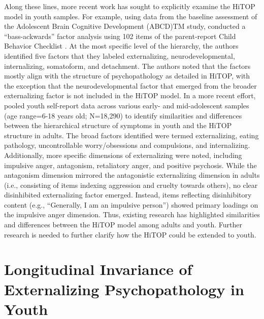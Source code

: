 \documentclass[
  20pt,
  number,
  preprint,
  3p,
  twocolumn]{elsarticle}
\begin{document}
Along these lines, more recent work has sought to explicitly examine the
HiTOP model in youth samples. For example, using data from the baseline
assessment of the Adolescent Brain Cognitive Development (ABCD)TM study,
\citep{michelini2019} conducted a ``bass-ackwards'' factor analysis
\citep{goldberg2006} using 102 items of the parent-report Child Behavior
Checklist \citep{achenbach1999}. At the most specific level of the
hierarchy, the authors identified five factors that they labeled
externalizing, neurodevelopmental, internalizing, somatoform, and
detachment. The authors noted that the factors mostly align with the
structure of psychopathology as detailed in HiTOP, with the exception
that the neurodevelopmental factor that emerged from the broader
externalizing factor is not included in the HiTOP model. In a more
recent effort, \citep{forbes2023} pooled youth self-report data across
various early- and mid-adolescent samples (age range=6-18 years old;
N=18,290) to identify similarities and differences between the
hierarchical structure of symptoms in youth and the HiTOP structure in
adults. The broad factors identified were termed externalizing, eating
pathology, uncontrollable worry/obsessions and compulsions, and
internalizing. Additionally, more specific dimensions of externalizing
were noted, including impulsive anger, antagonism, retaliatory anger,
and positive psychosis. While the antagonism dimension mirrored the
antagonistic externalizing dimension in adults (i.e., consisting of
items indexing aggression and cruelty towards others), no clear
disinhibited externalizing factor emerged. Instead, items reflecting
disinhibitory content (e.g., ``Generally, I am an impulsive person'')
showed primary loadings on the impulsive anger dimension. Thus, existing
research has highlighted similarities and differences between the HiTOP
model among adults and youth. Further research is needed to further
clarify how the HiTOP could be extended to youth.

\hypertarget{longitudinal-invariance-of-externalizing-psychopathology-in-youth}{%
\section{Longitudinal Invariance of Externalizing Psychopathology in
Youth}\label{longitudinal-invariance-of-externalizing-psychopathology-in-youth}}
\end{document}
